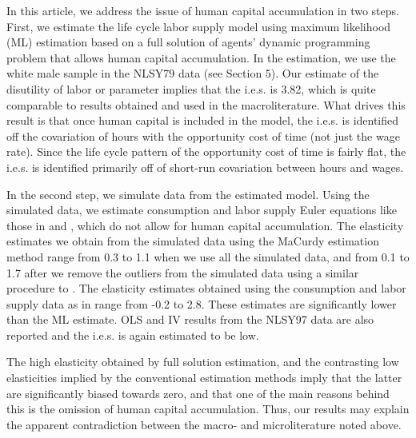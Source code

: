 \documentclass[\econtexRoot/ImaiKeane]{subfiles}
\begin{document}

In this article, we address the issue of human capital accumulation in two steps. First, we estimate the life cycle labor supply model using maximum likelihood (ML) estimation based on a full solution of agents' dynamic programming problem that allows human capital accumulation. In the estimation, we use the white male sample in the NLSY79 data (see Section 5). Our estimate of the disutility of labor or parameter implies that the i.e.s. is 3.82, which is quite comparable to results obtained and used in the macroliterature. What drives this result is that once human capital is included in the model, the i.e.s. is identified off the covariation of hours with the opportunity cost of time (not just the wage rate). Since the life cycle pattern of the opportunity cost of time is fairly flat, the i.e.s. is identified primarily off of short-run covariation between hours and wages. \par
In the second step, we simulate data from the estimated model. Using the simulated data, we estimate consumption and labor supply Euler equations like those in  \cite{MaCurdy1981-iy} and \cite{Altonji1986-zf}, which do not allow for human capital accumulation. The elasticity estimates we obtain from the simulated data using the MaCurdy estimation method range from 0.3 to 1.1 when we use all the simulated data, and from 0.1 to 1.7 after we remove the outliers from the simulated data using a similar procedure to \cite{MaCurdy1981-iy}. The elasticity estimates obtained using the consumption and labor supply data as in  \cite{Altonji1986-zf} range from -0.2 to 2.8. These estimates are significantly lower than the ML estimate. OLS and IV results from the NLSY97 data are also reported and the i.e.s. is again estimated to be low. \par
The high elasticity obtained by full solution estimation, and the contrasting low elasticities implied by the conventional estimation methods imply that the latter are significantly biased towards zero, and that one of the main reasons behind this is the omission of human capital accumulation. Thus, our results may explain the apparent contradiction between the macro- and microliterature noted above. \par
\end{document}
